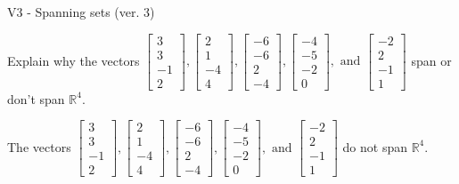 \begin{exercise}
  \begin{exerciseTitle}V3 - Spanning sets (ver. 3)\end{exerciseTitle}
  \begin{exerciseStatement}
    Explain why the vectors \(\left[\begin{array}{r}
3 \\
3 \\
-1 \\
2
\end{array}\right] , \left[\begin{array}{r}
2 \\
1 \\
-4 \\
4
\end{array}\right] , \left[\begin{array}{r}
-6 \\
-6 \\
2 \\
-4
\end{array}\right] , \left[\begin{array}{r}
-4 \\
-5 \\
-2 \\
0
\end{array}\right] , \text{ and } \left[\begin{array}{r}
-2 \\
2 \\
-1 \\
1
\end{array}\right]\) span or don't span \(\mathbb{R}^4\). 
	


  \end{exerciseStatement}
  \begin{exerciseAnswer}
   The vectors \(\left[\begin{array}{r}
3 \\
3 \\
-1 \\
2
\end{array}\right] , \left[\begin{array}{r}
2 \\
1 \\
-4 \\
4
\end{array}\right] , \left[\begin{array}{r}
-6 \\
-6 \\
2 \\
-4
\end{array}\right] , \left[\begin{array}{r}
-4 \\
-5 \\
-2 \\
0
\end{array}\right] , \text{ and } \left[\begin{array}{r}
-2 \\
2 \\
-1 \\
1
\end{array}\right]\) 
  	 do not  
	span \(\mathbb{R}^4\).
  



\end{exerciseAnswer}
\end{exercise}
